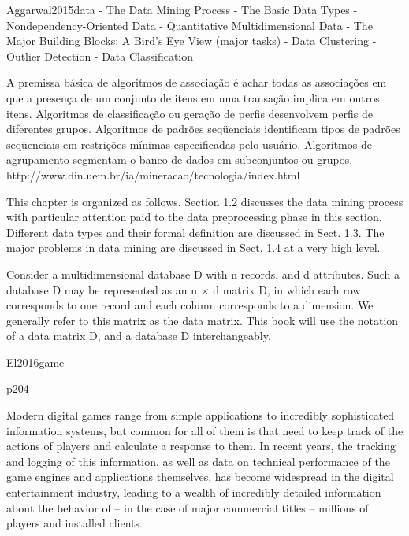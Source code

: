 Aggarwal2015data
- The Data Mining Process
- The Basic Data Types
  - Nondependency-Oriented Data
    - Quantitative Multidimensional Data
- The Major Building Blocks: A Bird’s Eye View (major tasks)
  - Data Clustering
  - Outlier Detection
  - Data Classification




A premissa básica de algoritmos de associação é achar todas as associações em que a presença de um conjunto de itens em uma transação implica em outros itens. Algoritmos de classificação ou geração de perfis desenvolvem perfis de diferentes grupos. Algoritmos de padrões seqüenciais identificam tipos de padrões seqüenciais em restrições mínimas especificadas pelo usuário. Algoritmos de agrupamento segmentam o banco de dados em subconjuntos ou grupos.
http://www.din.uem.br/ia/mineracao/tecnologia/index.html



This chapter is organized as follows. Section 1.2 discusses the data mining process with particular attention paid to the data preprocessing phase in this section. Different data types and their formal definition are discussed in Sect. 1.3. The major problems in data mining are discussed in Sect. 1.4 at a very high level.

Consider a multidimensional database D with n records, and d attributes. Such a database D may be represented as an n × d matrix D, in which each row corresponds to one record and each column corresponds to a dimension. We generally refer to this matrix as the data matrix. This book will use the notation of a data matrix D, and a database D interchangeably.


El2016game

p204

Modern digital games range from simple applications to incredibly sophisticated information systems, but common for all of them is that need to keep track of the actions of players and calculate a response to them. In recent years, the tracking and logging of this information, as well as data on technical performance of the game engines and applications themselves, has become widespread in the digital entertainment industry, leading to a wealth of incredibly detailed information about the behavior of – in the case of major commercial titles – millions of players and installed clients.


